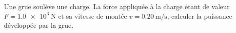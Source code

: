 Une grue soulève une charge. La force appliquée à la charge étant de valeur
$F=\qty{1.0e3}{\N}$ et sa vitesse de montée $v=\qty{0.20}{\m\per\s}$, calculer
la puissance développée par la grue.


